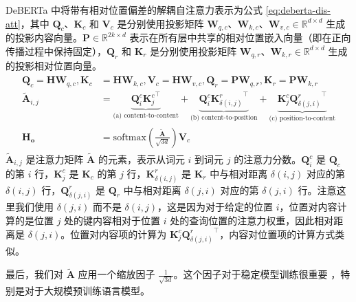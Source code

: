 DeBERTa 中将带有相对位置偏差的解耦自注意力表示为公式 \ref{eq:deberta-dis-att}，其中 $\mathbf{Q}_{c}$、$\mathbf{K}_{c}$ 和 $\mathbf{V}_{c}$ 是分别使用投影矩阵 $\mathbf{W}_{q,c}$、$\mathbf{W}_{k,c}$、$\mathbf{W}_{v,c} \in \mathbb{R}^{d×d}$ 生成的投影内容向量。$\mathbf{P} \in \mathbb{R}^{2k×d}$ 表示在所有层中共享的相对位置嵌入向量（即在正向传播过程中保持固定），$\mathbf{Q}_{r}$ 和 $\mathbf{K}_{r}$ 是分别使用投影矩阵 $\mathbf{W}_{q,r}$、$\mathbf{W}_{k,r} \in \mathbb{R}^{d×d}$ 生成的投影相对位置向量。
\begin{align} \label{eq:deberta-dis-att}
\begin{split}
    \mathbf{Q}_c = \mathbf{H} \mathbf{W}_{q,c}, 
    \mathbf{K}_c &= \mathbf{H} \mathbf{W}_{k,c}, 
    \mathbf{V}_c = \mathbf{H} \mathbf{W}_{v,c}, 
    \mathbf{Q}_r = \mathbf{P} \mathbf{W}_{q,r}, 
    \mathbf{K}_r = \mathbf{P} \mathbf{W}_{k,r} \\
    \tilde{\mathbf{A}}_{i,j} &= \underbrace{\mathbf{Q}^{c}_{i}{\mathbf{K}^{c}_{j}}^{\intercal}}_{\text{(a) content-to-content}}  
    + \underbrace{\mathbf{Q}^{c}_{i}{{\mathbf{K}^{r}_{\delta(i,j)}}^{\intercal}}}_{\text{(b) content-to-position}}
    + \underbrace{\mathbf{K}^{c}_{j}{{\mathbf{Q}^{r}_{\delta(j,i)}}^{\intercal}}}_{\text{(c) position-to-content}} \\
    \mathbf{H_o} &= \text{softmax}(\frac{\tilde{\mathbf{A}}}{\sqrt{3d}})\mathbf{V}_c
\end{split}
\end{align}
$\tilde{\mathbf{A}}_{i, j}$ 是注意力矩阵 $\tilde{\mathbf{A}}$ 的元素，表示从词元 $i$ 到词元 $j$ 的注意力分数。$\mathbf{Q}_{i}^{c}$ 是 $\mathbf{Q}_{c}$ 的第 $i$ 行，$\mathbf{K}_{j}^{c}$ 是 $\mathbf{K}_{c}$ 的第 $j$ 行，$\mathbf{K}_{\delta(i, j)}^{r}$ 是 $\mathbf{K}_{r}$ 中与相对距离 $\delta(i, j)$ 对应的第 $\delta(i, j)$ 行，$\mathbf{Q}_{\delta(j, i)}^{r}$ 是 $\mathbf{Q}_{r}$ 中与相对距离 $\delta(j, i)$ 对应的第 $\delta(j, i)$ 行。注意这里我们使用 $\delta(j, i)$ 而不是 $\delta(i, j)$，这是因为对于给定的位置 $i$，位置对内容计算的是位置 $j$ 处的键内容相对于位置 $i$ 处的查询位置的注意力权重，因此相对距离是 $\delta(j, i)$。位置对内容项的计算为 $\mathbf{K}_{j}^{c}{\mathbf{Q}_{\delta(j, i)}^{r}}^{\intercal}$，内容对位置项的计算方式类似。

最后，我们对 $\tilde{\mathbf{A}}$ 应用一个缩放因子 $\frac{1}{\sqrt{3d}}$。这个因子对于稳定模型训练很重要 \cite{transformer}，特别是对于大规模预训练语言模型。

